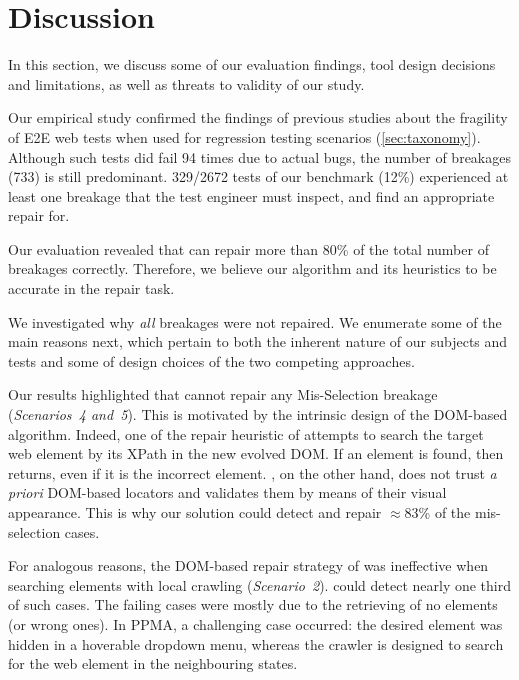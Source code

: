 \section{Discussion}\label{sec:discussion} 

In this section, we discuss some of our evaluation findings, tool design decisions and limitations, as well as threats to validity of our study.

 Our empirical study confirmed the findings of previous studies about the fragility of E2E web tests when used for regression testing scenarios (\autoref{sec:taxonomy}). 
Although such tests did fail 94 times due to actual bugs, the number of breakages (733) is still predominant. 329/2672 tests of our benchmark (12\%) experienced at least one breakage that the test engineer must inspect, and find an appropriate repair for. 

Our evaluation revealed that \tool can repair more than 80\% of the total number of breakages correctly. Therefore, we believe our algorithm and its heuristics to be accurate in the repair task.

We investigated why \emph{all} breakages were not repaired. We enumerate some of the main reasons next, which pertain to both the inherent nature of our subjects and tests and some of design choices of the two competing approaches. 

Our results highlighted that \water cannot repair any Mis-Selection breakage (\textit{Scenarios~4 and~5}). This is motivated by the intrinsic design of the DOM-based algorithm. Indeed, one of the repair heuristic of \water attempts to search the target web element by its XPath in the new evolved DOM. If an element is found, then \water returns, even if it is the incorrect element. \tool, on the other hand, does not trust \textit{a priori} DOM-based locators and validates them by means of their visual appearance. This is why our solution could detect and repair $\approx$83\% of the mis-selection cases. 

For analogous reasons, the DOM-based repair strategy of \water was ineffective when searching elements with local crawling (\textit{Scenario~2}). \tool could detect nearly one third of such cases. The failing cases were mostly due to the retrieving of no elements (or wrong ones). In PPMA, a challenging case occurred: the desired element was hidden in a hoverable dropdown menu, whereas the crawler is designed to search for the web element in the neighbouring states. 

